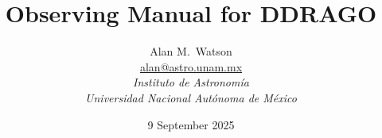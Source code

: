 \title{
\bfseries Observing Manual for DDRAGO
}

\author{
Alan M.\ Watson\\
\href{mailto:alan@astro.unam.mx}{alan@astro.unam.mx}\\[\medskipamount]
\itshape Instituto de Astronomía\\
\itshape Universidad Nacional Autónoma de México
}

\date{9 September 2025}

\maketitle

\tableofcontents